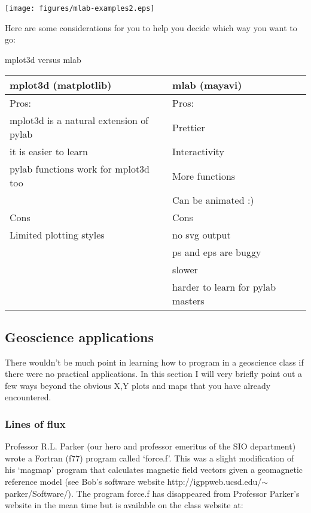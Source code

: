 \texttt{[image: figures/mlab-examples2.eps]}

\eject

Here are some considerations for you to help you decide which way you want to go: 

\centerline{mplot3d versus mlab}


\begin{tabular}{l|l}
\hline
mplot3d (matplotlib)  & mlab (mayavi)\\
\hline
Pros: & Pros:\\
\hline
mplot3d is a natural extension of pylab &  Prettier\\
 it is easier to learn & Interactivity\\
 pylab functions work for mplot3d too & More functions\\
 & Can be animated :)\\
\hline
Cons & Cons\\
\hline
 Limited plotting styles &no svg output \\
 & ps and eps are buggy\\
 & slower\\
& harder to learn for pylab masters\\
\hline
\end{tabular}




\subsection{Geoscience applications}


There wouldn't be much point in learning how to program in a geoscience class if there were no practical applications.  In this section I will very briefly point out a few ways beyond the obvious X,Y plots and maps that you have already encountered.  

\subsubsection{Lines of flux}

Professor R.L.  Parker (our hero and professor emeritus of the SIO department) wrote a Fortran (f77) program called `force.f'. This was a slight modification of his   `magmap'  program that calculates magnetic field vectors given a geomagnetic reference model (see Bob's software website http://igppweb.ucsd.edu/$\sim$parker/Software/).  The program   force.f  has disappeared from Professor Parker's website in the mean time but is available on the class website at:
 

